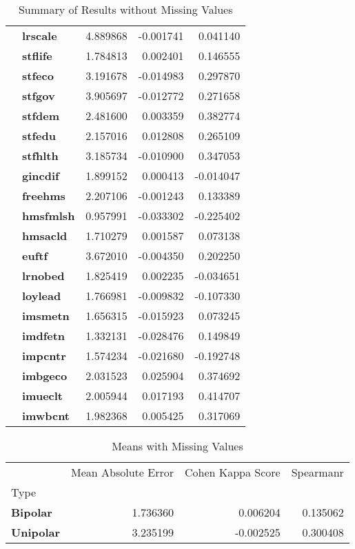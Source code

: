 \begin{table}[H]
\begin{tabular}{llrrr}
    \textbf{} & \textbf{lrscale} & 4.889868 & -0.001741 & 0.041140 \\
    \textbf{} & \textbf{stflife} & 1.784813 & 0.002401 & 0.146555 \\
    \textbf{} & \textbf{stfeco} & 3.191678 & -0.014983 & 0.297870 \\
    \textbf{} & \textbf{stfgov} & 3.905697 & -0.012772 & 0.271658 \\
    \textbf{} & \textbf{stfdem} & 2.481600 & 0.003359 & 0.382774 \\
    \textbf{} & \textbf{stfedu} & 2.157016 & 0.012808 & 0.265109 \\
    \textbf{} & \textbf{stfhlth} & 3.185734 & -0.010900 & 0.347053 \\
    \textbf{} & \textbf{gincdif} & 1.899152 & 0.000413 & -0.014047 \\
    \textbf{} & \textbf{freehms} & 2.207106 & -0.001243 & 0.133389 \\
    \textbf{} & \textbf{hmsfmlsh} & 0.957991 & -0.033302 & -0.225402 \\
    \textbf{} & \textbf{hmsacld} & 1.710279 & 0.001587 & 0.073138 \\
    \textbf{} & \textbf{euftf} & 3.672010 & -0.004350 & 0.202250 \\
    \textbf{} & \textbf{lrnobed} & 1.825419 & 0.002235 & -0.034651 \\
    \textbf{} & \textbf{loylead} & 1.766981 & -0.009832 & -0.107330 \\
    \textbf{} & \textbf{imsmetn} & 1.656315 & -0.015923 & 0.073245 \\
    \textbf{} & \textbf{imdfetn} & 1.332131 & -0.028476 & 0.149849 \\
    \textbf{} & \textbf{impcntr} & 1.574234 & -0.021680 & -0.192748 \\
    \textbf{} & \textbf{imbgeco} & 2.031523 & 0.025904 & 0.374692 \\
    \textbf{} & \textbf{imueclt} & 2.005944 & 0.017193 & 0.414707 \\
    \textbf{} & \textbf{imwbcnt} & 1.982368 & 0.005425 & 0.317069 \\
    \cline{1-5}
    \bottomrule
    \end{tabular}
    \caption{Summary of Results without Missing Values}
\end{table}


\begin{table}[H]
    \begin{tabular}{lrrr}
    \toprule
     & Mean Absolute Error & Cohen Kappa Score & Spearmanr \\
    Type &  &  &  \\
    \midrule
    \textbf{Bipolar} & 1.736360 & 0.006204 & 0.135062 \\
    \textbf{Unipolar} & 3.235199 & -0.002525 & 0.300408 \\
    \bottomrule
    \end{tabular}
    \caption{Means with Missing Values}
\end{table}
    

